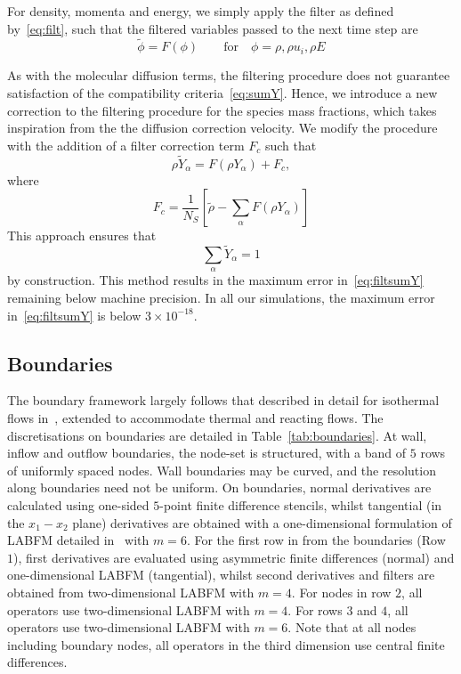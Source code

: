 \documentclass[notitlepage]{revtex4-1}
\begin{document}
For density, momenta and energy, we simply apply the filter as defined by~\eqref{eq:filt}, such that the filtered variables passed to the next time step are
\begin{equation}\widetilde{\phi}=F\left(\phi\right)\qquad\text{for}\quad\phi=\rho,\rho{u}_{i},\rho{E}\end{equation}

As with the molecular diffusion terms, the filtering procedure does not guarantee satisfaction of the compatibility criteria~\eqref{eq:sumY}. Hence, we introduce a new correction to the filtering procedure for the species mass fractions, which takes inspiration from the the diffusion correction velocity. We modify the procedure with the addition of a filter correction term $F_{c}$ such that
\begin{equation}\widetilde{\rho{Y}_{\alpha}}=F\left(\rho{Y}_{\alpha}\right)+F_{c},\end{equation}
where 
\begin{equation}F_{c}=\frac{1}{N_{S}}\left[\widetilde{\rho}-\displaystyle\sum_{\alpha}F\left(\rho{Y}_{\alpha}\right)\right]\end{equation}
This approach ensures that
\begin{equation}\displaystyle\sum_{\alpha}\widetilde{Y}_{\alpha}=1\label{eq:filtsumY}\end{equation}
by construction. This method results in the maximum error in~\eqref{eq:filtsumY} remaining below machine precision. In all our simulations, the maximum error in~\eqref{eq:filtsumY} is below $3\times{10}^{-18}$.


\subsection{Boundaries}

The boundary framework largely follows that described in detail for isothermal flows in~\cite{king_2022}, extended to accommodate thermal and reacting flows. The discretisations on boundaries are detailed in Table~\ref{tab:boundaries}. At wall, inflow and outflow boundaries, the node-set is structured, with a band of $5$ rows of uniformly spaced nodes. Wall boundaries may be curved, and the resolution along boundaries need not be uniform. On boundaries, normal derivatives are calculated using one-sided $5$-point finite difference stencils, whilst tangential (in the $x_{1}-x_{2}$ plane) derivatives are obtained with a one-dimensional formulation of LABFM detailed in~\cite{king_2022} with $m=6$. For the first row in from the boundaries (Row $1$), first derivatives are evaluated using asymmetric finite differences (normal) and one-dimensional LABFM (tangential), whilst second derivatives and filters are obtained from two-dimensional LABFM with $m=4$. For nodes in row $2$, all operators use two-dimensional LABFM with $m=4$. For rows $3$ and $4$, all operators use two-dimensional LABFM with $m=6$. Note that at all nodes including boundary nodes, all operators in the third dimension use central finite differences.
\end{document}
